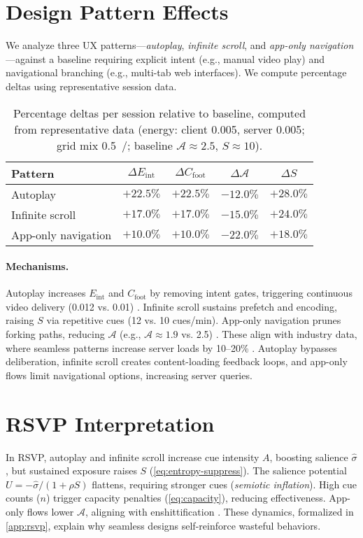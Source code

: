 \documentclass[openany]{book}
\newcommand{\Sent}{S} %
\newcommand{\Eint}{E_{\mathrm{int}}} %
\newcommand{\Cfoot}{C_{\mathrm{foot}}} %
\newcommand{\Auton}{\mathcal{A}} %
\newcommand{\kWh}{\mathrm{kWh}}
\begin{document}
\section{Design Pattern Effects}
\label{sec:pattern-effects}
We analyze three UX patterns---\emph{autoplay}, \emph{infinite scroll}, and \emph{app-only navigation}---against a baseline requiring explicit intent (e.g., manual video play) and navigational branching (e.g., multi-tab web interfaces). We compute percentage deltas using representative session data.

\begin{table}[h]
\centering
\begin{tabular}{lcccc}
\hline
\textbf{Pattern} & $\Delta \Eint$ & $\Delta \Cfoot$ & $\Delta \Auton$ & $\Delta \Sent$ \\
\hline
Autoplay & $+22.5\%$ & $+22.5\%$ & $-12.0\%$ & $+28.0\%$ \\
Infinite scroll & $+17.0\%$ & $+17.0\%$ & $-15.0\%$ & $+24.0\%$ \\
App-only navigation & $+10.0\%$ & $+10.0\%$ & $-22.0\%$ & $+18.0\%$ \\
\hline
\end{tabular}
\caption{Percentage deltas per session relative to baseline, computed from representative data (energy: client \SI{0.005}{\kWh}, server \SI{0.005}{\kWh}; grid mix \SI{0.5}{\kgCOe/\kWh}; baseline $\Auton \approx 2.5$, $\Sent \approx 10$).}
\label{tab:deltas}
\end{table}

\paragraph{Mechanisms.}
Autoplay increases \(\Eint\) and \(\Cfoot\) by removing intent gates, triggering continuous video delivery (\SI{0.012}{\kWh} vs. \SI{0.01}{\kWh}) \citep{extentia2024}. Infinite scroll sustains prefetch and encoding, raising \(\Sent\) via repetitive cues (12 vs. 10 cues/min). App-only navigation prunes forking paths, reducing \(\Auton\) (e.g., \(\Auton \approx 1.9\) vs. 2.5) \citep{doctorow2022}. These align with industry data, where seamless patterns increase server loads by 10--20\% \citep{colak2024}. Autoplay bypasses deliberation, infinite scroll creates content-loading feedback loops, and app-only flows limit navigational options, increasing server queries.

\section{RSVP Interpretation}
\label{sec:hidden-rsvp}
In RSVP, autoplay and infinite scroll increase cue intensity \(A\), boosting salience \(\widehat{\sigma}\), but sustained exposure raises \(\Sent\) (\cref{eq:entropy-suppress}). The salience potential \(U=-\widehat{\sigma}/(1+\rho \Sent)\) flattens, requiring stronger cues (\emph{semiotic inflation}). High cue counts (\(n\)) trigger capacity penalties (\cref{eq:capacity}), reducing effectiveness. App-only flows lower \(\Auton\), aligning with enshittification \citep{doctorow2022}. These dynamics, formalized in \cref{app:rsvp}, explain why seamless designs self-reinforce wasteful behaviors.
\end{document}
